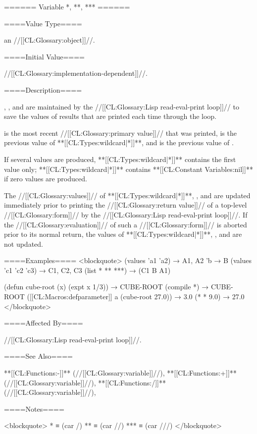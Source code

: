 ====== Variable *, **, *** ======

====Value Type====

an //[[CL:Glossary:object]]//.

====Initial Value====

//[[CL:Glossary:implementation-dependent]]//.

====Description====

\Thevariables{*}, \misc{**}, and \misc{***} are maintained by the //[[CL:Glossary:Lisp read-eval-print loop]]// to save the values of results that are printed each time through the loop.

\Thevalueof{*} is the most recent //[[CL:Glossary:primary value]]// that was printed, \thevalueof{**} is the previous value of **[[CL:Types:wildcard|*]]**, and \thevalueof{***} is the previous value of \misc{**}.

If several values are produced, **[[CL:Types:wildcard|*]]** contains the first value only; **[[CL:Types:wildcard|*]]** contains **[[CL:Constant Variables:nil]]** if zero values are produced.

The //[[CL:Glossary:values]]// of **[[CL:Types:wildcard|*]]**, \misc{**}, and \misc{***} are updated immediately prior to printing the //[[CL:Glossary:return value]]// of a top-level //[[CL:Glossary:form]]// by the //[[CL:Glossary:Lisp read-eval-print loop]]//. If the //[[CL:Glossary:evaluation]]// of such a //[[CL:Glossary:form]]// is aborted prior to its normal return, the values of **[[CL:Types:wildcard|*]]**, \misc{**}, and \misc{***} are not updated.

====Examples==== <blockquote> (values 'a1 'a2) → A1, A2 'b → B (values 'c1 'c2 'c3) → C1, C2, C3 (list * ** ***) → (C1 B A1)

(defun cube-root (x) (expt x 1/3)) → CUBE-ROOT (compile *) → CUBE-ROOT ([[CL:Macros:defparameter]] a (cube-root 27.0)) → 3.0 (* * 9.0) → 27.0 </blockquote>

====Affected By====

//[[CL:Glossary:Lisp read-eval-print loop]]//.

====See Also====

**[[CL:Functions:-]]** (//[[CL:Glossary:variable]]//), **[[CL:Functions:+]]** (//[[CL:Glossary:variable]]//), **[[CL:Functions:/]]** (//[[CL:Glossary:variable]]//), {\secref\TopLevelLoop}

====Notes====

<blockquote> * ≡ (car /) ** ≡ (car //) *** ≡ (car ///) </blockquote>


